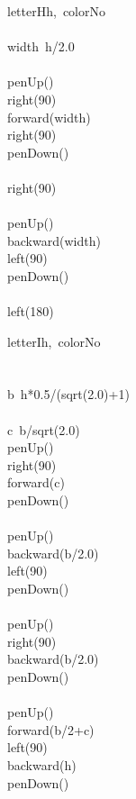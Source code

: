 \documentclass[a4paper,10pt]{article}
\begin{document}
\begin{pseudocode}{letterH}{h,\ colorNo }
\label{letterH}
\\
\\
  width\gets\ h/2.0\\
  \\
  penUp()\\
  right(90)\\
  forward(width)\\
  right(90)\\
  penDown()\\
  \\
  right(90)\\
  \\
  penUp()\\
  backward(width)\\
  left(90)\\
  penDown()\\
  \\
  left(180)\\
\ENDPROCEDURE
\end{pseudocode}


\begin{pseudocode}{letterI}{h,\ colorNo }
\label{letterI}
\\
\\
  \\
  b\gets\ h*0.5/(sqrt(2.0)+1)\\
  \\
  c\gets\ b/sqrt(2.0)\\
  penUp()\\
  right(90)\\
  forward(c)\\
  penDown()\\
  \\
  penUp()\\
  backward(b/2.0)\\
  left(90)\\
  penDown()\\
  \\
  penUp()\\
  right(90)\\
  backward(b/2.0)\\
  penDown()\\
  \\
  penUp()\\
  forward(b/2+c)\\
  left(90)\\
  backward(h)\\
  penDown()\\
\ENDPROCEDURE
\end{pseudocode}
\end{document}
